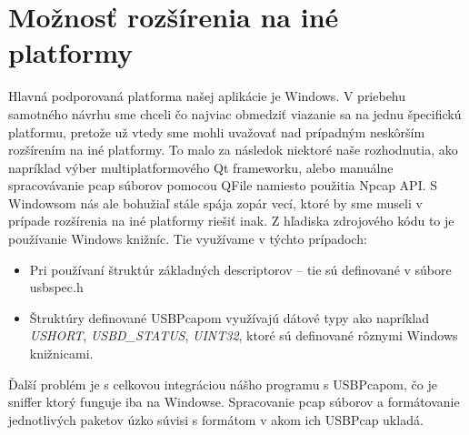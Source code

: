 \section{Možnosť rozšírenia na iné platformy}
Hlavná podporovaná platforma našej aplikácie je Windows. V priebehu samotného návrhu sme chceli čo najviac obmedziť viazanie sa na jednu špecifickú platformu, pretože už vtedy sme mohli uvažovať nad prípadným neskôrším rozšírením na iné platformy. To malo za následok niektoré naše rozhodnutia, ako napríklad výber multiplatformového Qt frameworku, alebo manuálne spracovávanie pcap súborov pomocou QFile namiesto použitia Npcap API. S Windowsom nás ale bohužiaľ stále spája zopár vecí, ktoré by sme museli v prípade rozšírenia na iné platformy riešiť inak. Z hľadiska zdrojového kódu to je používanie Windows knižníc. Tie využívame v týchto prípadoch:
\begin{itemize}
\item Pri používaní štruktúr základných descriptorov -- tie sú definované v súbore usbspec.h
\item Štruktúry definované USBPcapom využívajú dátové typy ako napríklad \textit{USHORT}, \textit{USBD\_STATUS}, \textit{UINT32}, ktoré sú definované rôznymi Windows knižnicami.
\end{itemize}

Ďalší problém je s celkovou integráciou nášho programu s USBPcapom, čo je sniffer ktorý funguje iba na Windowse. Spracovanie pcap súborov a formátovanie jednotlivých paketov úzko súvisi s formátom v akom ich USBPcap ukladá.